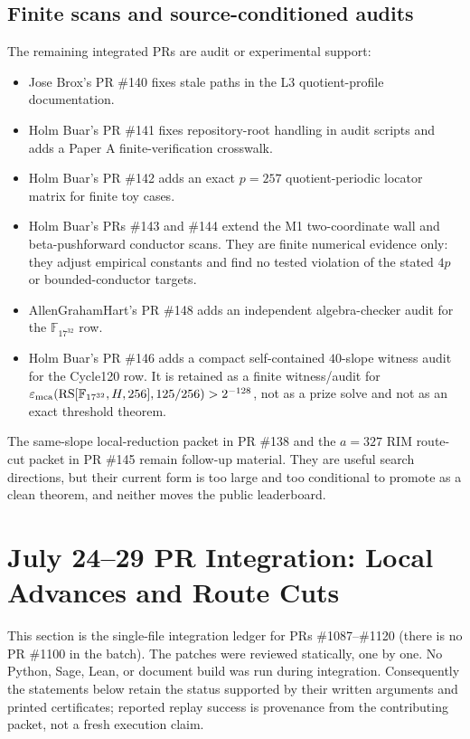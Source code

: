 \documentclass[11pt]{article}
\newcommand{\F}{\mathbb F}
\newcommand{\RS}{\operatorname{RS}}
\begin{document}
\subsection{Finite scans and source-conditioned audits}

The remaining integrated PRs are audit or experimental support:
\begin{itemize}
\item Jose Brox's PR \#140 fixes stale paths in the L3 quotient-profile
  documentation.
\item Holm Buar's PR \#141 fixes repository-root handling in audit scripts and
  adds a Paper A finite-verification crosswalk.
\item Holm Buar's PR \#142 adds an exact \(p=257\) quotient-periodic locator
  matrix for finite toy cases.
\item Holm Buar's PRs \#143 and \#144 extend the M1 two-coordinate wall and
  beta-pushforward conductor scans.  They are finite numerical evidence only:
  they adjust empirical constants and find no tested violation of the stated
  \(4p\) or bounded-conductor targets.
\item AllenGrahamHart's PR \#148 adds an independent algebra-checker audit for
  the \(\F_{17^{32}}\) row.
\item Holm Buar's PR \#146 adds a compact self-contained \(40\)-slope witness
  audit for the Cycle120 row.  It is retained as a finite witness/audit for
  \(\varepsilon_{\rm mca}(\RS[\F_{17^{32}},H,256],125/256)>2^{-128}\), not as a
  prize solve and not as an exact threshold theorem.
\end{itemize}

The same-slope local-reduction packet in PR \#138 and the \(a=327\) RIM
route-cut packet in PR \#145 remain follow-up material.  They are useful search
directions, but their current form is too large and too conditional to promote
as a clean theorem, and neither moves the public leaderboard.

\section{July 24--29 PR Integration: Local Advances and Route Cuts}
\label{sec:july-29-pr-integration}

This section is the single-file integration ledger for PRs
\#1087--\#1120 (there is no PR \#1100 in the batch).  The patches were reviewed
statically, one by one.  No Python, Sage, Lean, or document build was run during
integration.  Consequently the statements below retain the status supported by
their written arguments and printed certificates; reported replay success is
provenance from the contributing packet, not a fresh execution claim.
\end{document}
